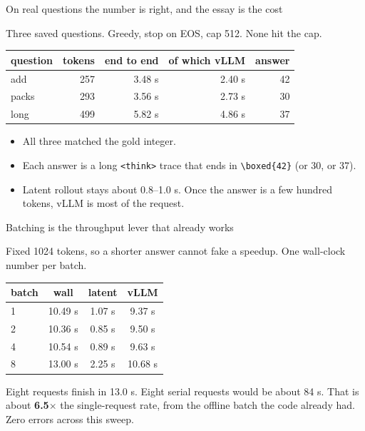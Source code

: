 \documentclass[aspectratio=169]{beamer}
\begin{document}
\begin{frame}{On real questions the number is right, and the essay is the cost}

Three saved questions. Greedy, stop on EOS, cap 512. None hit the cap.

\begin{center}
\begin{tabular}{lrrrr}
\toprule
question & tokens & end to end & of which vLLM & answer \\
\midrule
add    & 257 & 3.48 s & 2.40 s & 42 \\
packs  & 293 & 3.56 s & 2.73 s & 30 \\
long   & 499 & 5.82 s & 4.86 s & 37 \\
\bottomrule
\end{tabular}
\end{center}

\vspace{0.4em}
\begin{itemize}
  \item All three matched the gold integer.
  \item Each answer is a long \texttt{<think>} trace that ends in
        \texttt{\textbackslash boxed\{42\}} (or 30, or 37).
  \item Latent rollout stays about 0.8--1.0 s. Once the answer is a few
        hundred tokens, vLLM is most of the request.
\end{itemize}

\end{frame}

\begin{frame}{Batching is the throughput lever that already works}

Fixed 1024 tokens, so a shorter answer cannot fake a speedup.
One wall-clock number per batch.

\begin{center}
\begin{tabular}{lccc}
\toprule
batch & wall & latent & vLLM \\
\midrule
1 & 10.49 s & 1.07 s & 9.37 s \\
2 & 10.36 s & 0.85 s & 9.50 s \\
4 & 10.54 s & 0.89 s & 9.63 s \\
8 & 13.00 s & 2.25 s & 10.68 s \\
\bottomrule
\end{tabular}
\end{center}

\vspace{0.4em}
Eight requests finish in 13.0 s. Eight serial requests would be about 84 s.
That is about \textbf{6.5$\times$} the single-request rate, from the offline
batch the code already had. Zero errors across this sweep.

\end{frame}
\end{document}
